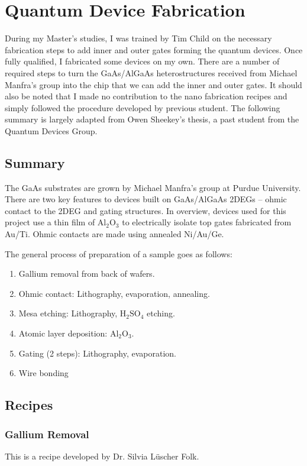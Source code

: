 \chapter{Quantum Device Fabrication}\label{cha:appendix1}


During my Master's studies, I was trained by Tim Child on the necessary fabrication steps to add inner and outer gates forming the quantum devices. Once fully qualified, I fabricated some devices on my own. There are a number of required steps to turn the GaAs/AlGaAs heterostructures received from Michael Manfra's group into the chip that we can add the inner and outer gates. It should also be noted that I made no contribution to the nano fabrication recipes and simply followed the procedure developed by previous student. The following summary is largely adapted from Owen Sheekey's thesis, a past student from the Quantum Devices Group. 

\section{Summary}
The GaAs substrates are grown by Michael Manfra’s group at Purdue University. There are two key features to devices built on GaAs/AlGaAs 2DEGs – ohmic contact to the 2DEG and gating structures. In overview, devices used for this project use a thin film of $\mathrm{Al_2O_3}$ to electrically isolate top gates fabricated from Au/Ti. Ohmic contacts are made using annealed Ni/Au/Ge.

The general process of preparation of a sample goes as follows:

\begin{enumerate}
\item Gallium removal from back of wafers.
\item Ohmic contact: Lithography, evaporation, annealing.
\item Mesa etching: Lithography, $\mathrm{H_2SO_4}$ etching.
\item Atomic layer deposition: $\mathrm{Al_2O_3}$.
\item Gating (2 steps): Lithography, evaporation.
\item Wire bonding
\end{enumerate}

\section{Recipes}

\subsection{Gallium Removal}
This is a recipe developed by Dr. Silvia Lüscher Folk.


